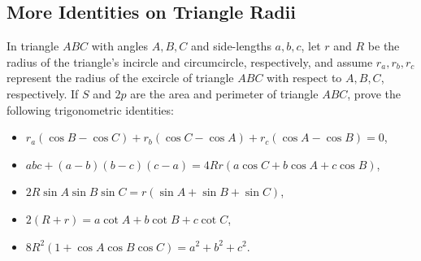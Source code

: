 \documentclass[12pt,a4paper]{memoir}
\theoremstyle{definition}
\begin{document}
\subsection{More Identities on Triangle Radii}



	\begin{question}[name=Trigonometric Identities on Radii]
		In triangle $ABC$ with angles $A,B,C$ and side-lengths $a,b,c$, let $r$ and $R$ be the radius of the triangle's incircle and circumcircle, respectively, and assume $r_a,r_b,r_c$ represent the radius of the excircle of triangle $ABC$ with respect to $A,B,C$, respectively. If $S$ and $2p$ are the area and perimeter of triangle $ABC$, prove the following trigonometric identities:
		\begin{itemize}
			\item $r_a(\cos B - \cos C) + r_b(\cos C - \cos A) + r_c(\cos A - \cos B)=0$,       
			\item $abc+(a-b)(b-c)(c-a)=4Rr(a\cos C + b\cos A + c\cos B)$,
			\item $2R\sin A \sin B \sin C = r(\sin A + \sin B + \sin C)$,
			\item $2(R+r)=a\cot A + b\cot B + c \cot C$,
			\item $8R^2(1+\cos A \cos B \cos C) = a^2+b^2+c^2$.
		\end{itemize}
	\end{question}
\end{document}
